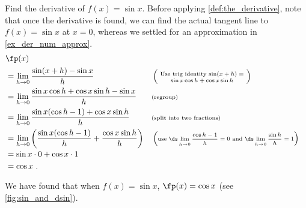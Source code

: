 \begin{example}\label{ex_deriv_sinx}
Find the derivative of $f(x) = \sin x$.
\solution
Before applying \autoref{def:the_derivative}, note that once the derivative is found, we can find the actual tangent line to $f(x) = \sin x$ at $x=0$, whereas we settled for an approximation in \autoref{ex_der_num_approx}. 
	\small
	\begin{align*}
		&\fp(x)\\
		&= \lim_{h\to 0} \frac{\sin(x+h)-\sin x}{h} & & \left(\text{\scriptsize \parbox{110pt}{\centering Use trig identity $\sin(x+h) = \sin x\cos h+\cos x\sin h$}}\right) \\
		&= \lim_{h\to 0} \frac{\sin x\cos h+\cos x\sin h-\sin x}{h} & & \text{\scriptsize (regroup)}\\
		&= \lim_{h\to 0} \frac{\sin x(\cos h-1) + \cos x\sin h}{h} & & \text{\scriptsize (split into two fractions)}\\
		&= \lim_{h\to 0} \left(\frac{\sin x(\cos h-1)}{h} + \frac{\cos x\sin h}{h}\right) & & \left(\text{\scriptsize use $\ds \lim_{h\to 0} \frac{\cos h-1}{h} = 0$ and $\ds \lim_{h\to 0} \frac{\sin h}{h} = 1$}\right)\\
		&=	\sin x\cdot 0 + \cos x \cdot 1 \\
		&= \cos x\ .
	\end{align*}
\end{example} %

We have found that when $f(x) = \sin x$, $\fp(x) = \cos x$ (see \autoref{fig:sin_and_dsin}).

